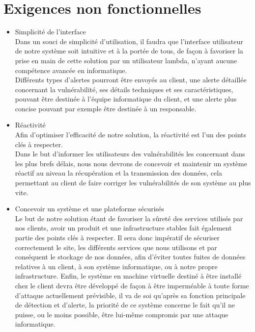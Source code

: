 \section{Exigences non fonctionnelles}
\begin{itemize}
\item Simplicité de l'interface\\
Dans un souci de simplicité d'utilisation, il faudra que l'interface utilisateur de notre système soit intuitive et à la portée de tous, de façon à favoriser la prise en main de cette solution par un utilisateur lambda, n'ayant aucune compétence avancée en informatique.\\
Différents types d'alertes pourront être envoyés au client, une alerte détaillée concernant la vulnérabilité, ses détails techniques et ses caractéristiques, pouvant être destinée à l'équipe informatique du client, et une alerte plus concise pouvant par exemple être destinée à un responsable.

\item Réactivité\\
Afin d'optimiser l'efficacité de notre solution, la réactivité est l'un des points clés à respecter.\\
Dans le but d'informer les utilisateurs des vulnérabilités les concernant dans les plus brefs délais, nous nous devrons de concevoir et maintenir un système réactif au niveau la récupération et la transmission des données, cela permettant au client de faire corriger les vulnérabilités de son système au plus vite.\\

\item Concevoir un système et une plateforme sécurisés\\
Le but de notre solution étant de favoriser la sûreté des services utilisés par nos clients, avoir un produit et une infrastructure stables fait également partie des points clés à respecter. Il sera donc impératif de sécuriser correctement le site, les différents services que nous utilisons et par conséquent le stockage de nos données, afin d'éviter toutes fuites de données relatives à un client, à son système informatique, ou à notre propre infrastructure. Enfin, le système en machine virtuelle destiné à être installé chez le client devra être développé de façon à être imperméable à toute forme d'attaque actuellement prévisible, il va de soi qu'après sa fonction principale de détection et d'alerte, la priorité de ce système concerne le fait qu'il ne puisse, ou le moins possible, être lui-même compromis par une attaque informatique.
  
\end{itemize}